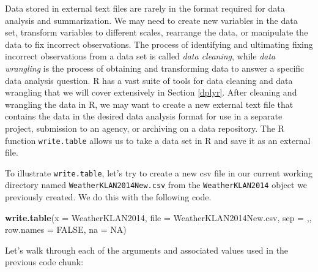 \documentclass[
]{krantz}
\newenvironment{Shaded}{\begin{snugshade}}{\end{snugshade}}
\newcommand{\DataTypeTok}[1]{\textcolor[rgb]{0.13,0.29,0.53}{#1}}
\newcommand{\KeywordTok}[1]{\textcolor[rgb]{0.13,0.29,0.53}{\textbf{#1}}}
\newcommand{\NormalTok}[1]{#1}
\newcommand{\OtherTok}[1]{\textcolor[rgb]{0.56,0.35,0.01}{#1}}
\newcommand{\StringTok}[1]{\textcolor[rgb]{0.31,0.60,0.02}{#1}}
\begin{document}
Data stored in external text files are rarely in the format required for data analysis and summarization. We may need to create new variables in the data set, transform variables to different scales, rearrange the data, or manipulate the data to fix incorrect observations. The process of identifying and ultimating fixing incorrect observations from a data set is called \emph{data cleaning}, while \emph{data wrangling} is the process of obtaining and transforming data to answer a specific data analysis question. R has a vast suite of tools for data cleaning and data wrangling that we will cover extensively in Section \ref{dplyr}. After cleaning and wrangling the data in R, we may want to create a new external text file that contains the data in the desired data analysis format for use in a separate project, submission to an agency, or archiving on a data repository. The R function \texttt{write.table} allows us to take a data set in R and save it as an external file.

To illustrate \texttt{write.table}, let's try to create a new csv file in our current working directory named \texttt{WeatherKLAN2014New.csv} from the \texttt{WeatherKLAN2014} object we previously created. We do this with the following code.

\begin{Shaded}
\begin{Highlighting}[]
\KeywordTok{write.table}\NormalTok{(}\DataTypeTok{x =}\NormalTok{ WeatherKLAN2014, }\DataTypeTok{file =} \StringTok{\textquotesingle{}WeatherKLAN2014New.csv\textquotesingle{}}\NormalTok{, }\DataTypeTok{sep =} \StringTok{\textquotesingle{},\textquotesingle{}}\NormalTok{,}
        \DataTypeTok{row.names =} \OtherTok{FALSE}\NormalTok{, }\DataTypeTok{na =} \StringTok{\textquotesingle{}NA\textquotesingle{}}\NormalTok{)}
\end{Highlighting}
\end{Shaded}

Let's walk through each of the arguments and associated values used in the previous code chunk:
\end{document}

